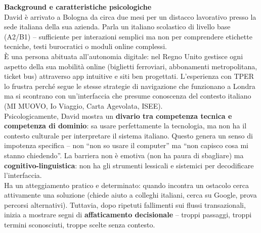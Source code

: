 ﻿\documentclass[11pt,a4paper]{article}
\begin{document}
\begin{tcolorbox}[base]
    \textbf{Background e caratteristiche psicologiche} \\[4pt]
    {\small
    David \`e arrivato a Bologna da circa due mesi per un distacco lavorativo presso la sede italiana della sua azienda. Parla un italiano scolastico di livello base (A2/B1) -- sufficiente per interazioni semplici ma non per comprendere etichette tecniche, testi burocratici o moduli online complessi. \\[4pt]

    \`E una persona abituata all'autonomia digitale: nel Regno Unito gestisce ogni aspetto della sua mobilit\`a online (biglietti ferroviari, abbonamenti metropolitana, ticket bus) attraverso app intuitive e siti ben progettati. L'esperienza con TPER lo frustra perch\'e segue le stesse strategie di navigazione che funzionano a Londra ma si scontrano con un'interfaccia che presume conoscenza del contesto italiano (MI MUOVO, Io Viaggio, Carta Agevolata, ISEE). \\[4pt]

    Psicologicamente, David mostra un \textbf{divario tra competenza tecnica e competenza di dominio}: sa usare perfettamente la tecnologia, ma non ha il contesto culturale per interpretare il sistema italiano. Questo genera un senso di impotenza specifica -- non ``non so usare il computer'' ma ``non capisco cosa mi stanno chiedendo''. La barriera non \`e emotiva (non ha paura di sbagliare) ma \textbf{cognitivo-linguistica}: non ha gli strumenti lessicali e sistemici per decodificare l'interfaccia. \\[4pt]

    Ha un atteggiamento pratico e determinato: quando incontra un ostacolo cerca attivamente una soluzione (chiede aiuto a colleghi italiani, cerca su Google, prova percorsi alternativi). Tuttavia, dopo ripetuti fallimenti sui flussi transazionali, inizia a mostrare segni di \textbf{affaticamento decisionale} -- troppi passaggi, troppi termini sconosciuti, troppe scelte senza contesto.
    }
\end{tcolorbox}

\vspace{0.3cm}

\end{document}

